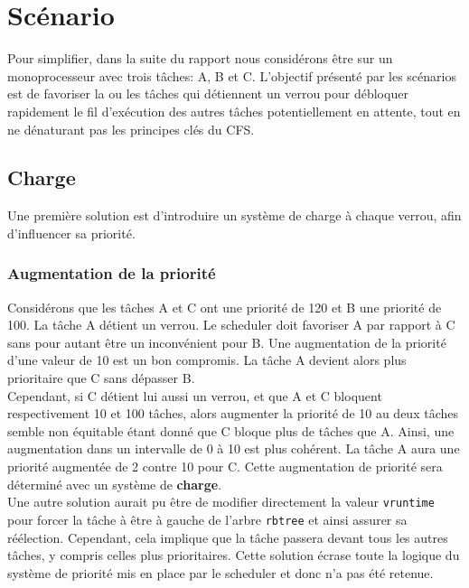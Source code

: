 \section{Scénario}

Pour simplifier, dans la suite du rapport nous considérons être sur un monoprocesseur
avec trois tâches: A, B et C. L'objectif présenté par les scénarios est de favoriser
la ou les tâches qui détiennent un verrou pour débloquer rapidement le fil d'exécution
des autres tâches potentiellement en attente, tout en ne dénaturant pas les principes
clés du CFS.


\subsection{Charge}

Une première solution est d'introduire un système de charge à chaque verrou, afin
d'influencer sa priorité.

\subsubsection{Augmentation de la priorité}

Considérons que les tâches A et C ont une priorité de 120 et B une priorité de 100.
La tâche A détient un verrou. Le scheduler doit favoriser A par rapport à C sans pour
autant être un inconvénient pour B.
Une augmentation de la priorité d'une valeur de 10 est un bon compromis. La tâche A
devient alors plus prioritaire que C sans dépasser B.
\\

Cependant, si C détient lui aussi un verrou, et que A et C bloquent respectivement 
10 et 100 tâches, alors augmenter la priorité de 10 au deux tâches semble non équitable
étant donné que C bloque plus de tâches que A. Ainsi, une augmentation dans un
intervalle de 0 à 10 est plus cohérent. La tâche A aura une priorité augmentée
de 2 contre 10 pour C. Cette augmentation de priorité sera déterminé
avec un système de \textbf{charge}.
\\

Une autre solution aurait pu être de modifier directement la valeur \verb|vruntime|
pour forcer la tâche à être à gauche de l'arbre \verb|rbtree| et ainsi assurer sa
réélection. Cependant, cela implique que la tâche passera devant tous les autres tâches,
y compris celles plus prioritaires. Cette solution écrase toute la logique du système
de priorité mis en place par le scheduler et donc n'a pas été retenue.



